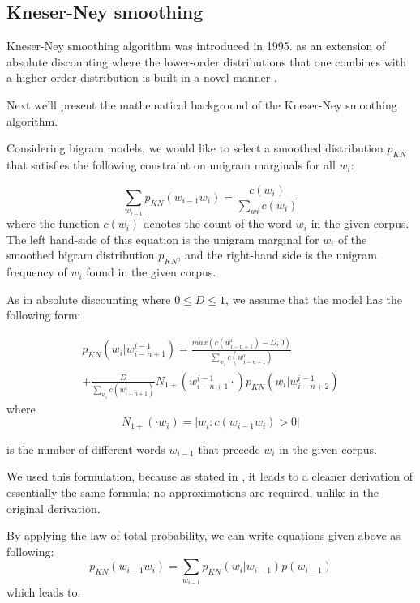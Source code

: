 \documentclass[10pt, a4paper]{article}
\begin{document}
\subsection{Kneser-Ney smoothing}
Kneser-Ney smoothing algorithm was introduced in 1995. as an extension of absolute discounting where the lower-order distributions that one combines with a higher-order distribution is built in a novel manner \cite{1_chen1999empirical}. 

Next we\rq{}ll present the mathematical background of the Kneser-Ney smoothing algorithm.

Considering bigram models, we would like to select a smoothed distribution $p_{KN}$ that satisfies the following constraint on unigram marginals for all $w_i$:

\begin{equation}
\sum_{w_{i - 1}} p_{KN}(w_{i-1}w_{i} ) = \frac{c(w_{i})}{\sum_{w{i}} c(w_{i})}
\end{equation}
where the function $c(w_{i})$ denotes the count of the word $w_{i}$ in the given corpus. The left hand-side of this equation is the unigram marginal for $w_{i}$ of the smoothed bigram distribution $p_{KN}$, and the right-hand side is the unigram frequency of $w_{i}$ found in the given corpus.

As in absolute discounting where $0 \le D \le 1$, we assume that the model has the following form:

\begin{multline}
p_{KN}(w_{i} | w_{i-n+1}^{i-1}) = \frac{max(c(w_{i-n+1}^{i}) - D, 0)}{\sum_{w_{i}} c(w_{i-n+1}^{i})}  \\ + \frac{D}{\sum_{w_{i}} c(w_{i-n+1}^{i})} N_{1+}(w_{i-n+1}^{i-1} \cdot) p_{KN}(w_{i} | w_{i-n+2}^{i-1}) 
\end{multline}
where 
\begin{equation}
N_{1+}(\cdot w_{i}) = |{w_{i} : c(w_{i-1}w_{i}) > 0}|
\end{equation}

is the number of different words $w_{i-1}$ that precede $w_{i}$ in the given corpus.

We used this formulation, because as stated in \cite{1_chen1999empirical}, it leads to a cleaner derivation of essentially the same formula; no approximations are required, unlike in the original derivation.

By applying the law of total probability, we can write equations given above as following:
\begin{equation}
p_{KN}(w_{i-1}w_{i} ) = \sum_{w_{i-1}} p_{KN}(w_{i} | w_{i-1} )p(w_{i-1})
\end{equation}
which leads to:
\end{document}
